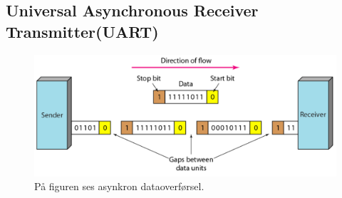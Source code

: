 \subsection{Universal Asynchronous Receiver Transmitter(UART)}

\begin{figure}[H]
	\centering
	\includegraphics[scale=0.6]{figures/bProblemloesning/asynkron.png}
	\caption{På figuren ses asynkron dataoverførsel.\citep{Sharma2016}}
	\label{fig:asynkron}
\end{figure}

